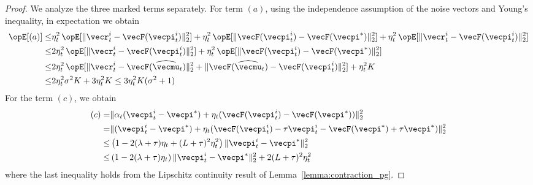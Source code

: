 \begin{proof}
We analyze the three marked terms separately.
For term $(a)$, using the independence assumption of the noise vectors and Young's inequality, in expectation we obtain
\begin{align*}
    \Exop[(a)] \leq &\eta_t^2 \Exop[\| \vecr_t^i - \vecF(\vecpi_t^i) \|_2^2] + \eta_t^2 \Exop[\|\vecF(\vecpi_t^i) - \vecF(\vecpi^*)\|_2^2] + \eta_t^2 \Exop[\| \vecr_t^i - \vecF(\vecpi_t^i) \|_2^2] \\
    \leq &2\eta_t^2 \Exop[\| \vecr_t^i - \vecF(\vecpi_t^i) \|_2^2] + \eta_t^2 \Exop[\|\vecF(\vecpi_t^i) - \vecF(\vecpi^*)\|_2^2] \\
    \leq & 2\eta_t^2 \Exop[\| \vecr_t^i - \vecF(\widehat{\vecmu}_t)\|_2^2 + \| \vecF(\widehat{\vecmu}_t) - \vecF(\vecpi^i_t)\|_2^2 ] + \eta_t^2 K \\
    \leq & 2\eta_t^2 \sigma^2 K + 3\eta_t^2 K \leq 3\eta_t^2 K(\sigma^2 + 1)
\end{align*}
For the term $(c)$, we obtain
\begin{align*}
    (c) = &\|\alpha_t (\vecpi_t^i - \vecpi^*) + \eta_t (\vecF(\vecpi_t^i) - \vecF(\vecpi^*))\|_2^2 \\
        = & \|(\vecpi_t^i - \vecpi^*) + \eta_t (\vecF(\vecpi_t^i) - \tau \vecpi_t^i - \vecF(\vecpi^*) + \tau \vecpi^* )\|_2^2 \\
        \leq & \left(1 - 2 (\lambda + \tau) \eta_t + (L + \tau)^2 \eta_t^2\right) \| \vecpi_t^i - \vecpi^* \|_2^2 \\
        \leq & \left(1 - 2 (\lambda + \tau) \eta_t \right) \| \vecpi_t^i - \vecpi^* \|_2^2 + 2(L + \tau)^2 \eta_t^2
\end{align*}
where the last inequality holds from the Lipschitz continuity result of Lemma~\ref{lemma:contraction_pg}.


\end{proof}
